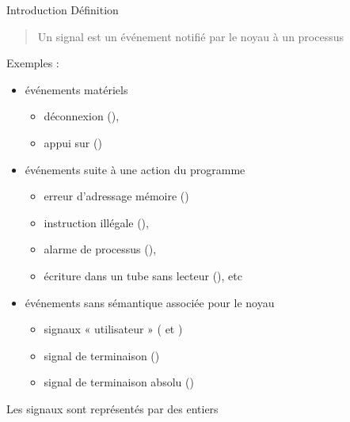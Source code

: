 \def\inc{inc7-sig}

\newcommand {\ctrl} [2] {\framebox{#2{}CTRL}\framebox{#2{}#1}}




\begin {frame} {Introduction}
    Définition
    \begin {quote}
	Un signal est un événement notifié par le noyau à un processus
    \end {quote}

    \vspace* {-2mm}
    
    Exemples :
    \begin {itemize}
	\item événements matériels
	    \begin {itemize}
		\item déconnexion (),
		\item appui sur \ctrl{C}{\fD}
		    ()
	    \end {itemize}
	\item événements suite à une action du programme
	    \begin {itemize}
		\item erreur d'adressage mémoire ()
		\item instruction illégale (),
		\item alarme de processus (),
		\item écriture dans un tube sans lecteur (), etc
	    \end {itemize}
	\item événements sans sémantique associée pour le noyau
	    \begin {itemize}
		\item signaux « utilisateur » ( et
		    )
		\item signal de terminaison ()
		\item signal de terminaison absolu ()
	    \end {itemize}

    \end {itemize}

    Les signaux sont représentés par des entiers \implique {}
\end {frame}

